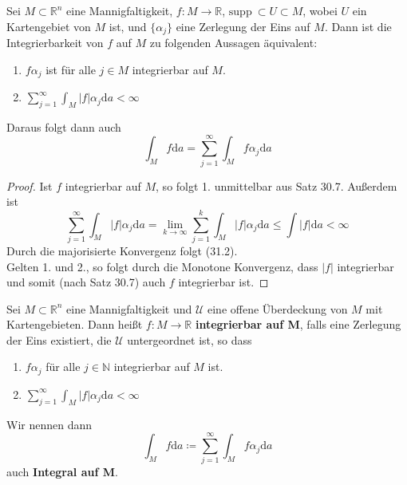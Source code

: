 \begin{lemma}
Sei $M\subset\mathbb{R}^n$ eine Mannigfaltigkeit, $f:M\rightarrow\mathbb{R}$, 
	$\mathrm{supp\ }\subset U \subset M$, wobei $U$ ein Kartengebiet 
	von $M$ ist, und $\{\alpha_j\}$ eine Zerlegung der Eins auf $M$. 
	Dann ist die Integrierbarkeit von $f$ auf $M$ zu folgenden 
	Aussagen äquivalent:
	\begin{enumerate}
		\item 	$f\alpha_j$ ist für alle $j\in M$ integrierbar auf $M$.
		\item	$\sum\limits_{j=1}^\infty\int_M|f|\alpha_j\mathrm{d}a<\infty$
	\end{enumerate}
	Daraus folgt dann auch
	\begin{equation}
		\int_Mf\mathrm{d}a=\sum\limits_{j=1}^\infty\int_Mf\alpha_j\mathrm{d}a
	\end{equation}
\end{lemma}

\begin{proof}
	Ist $f$ integrierbar auf $M$, so folgt 1. unmittelbar aus Satz 
	30.7. Außerdem ist
	\begin{equation*}
		\sum\limits_{j=1}^\infty\int_M|f|\alpha_j\mathrm{d}a = 
		\lim\limits_{ k \rightarrow \infty }\sum\limits_{j=1}^k\int_M|f|\alpha_j\mathrm{d}a \leq 
		\int|f|\mathrm{d}a < \infty
	\end{equation*}
	Durch die majorisierte Konvergenz folgt (31.2).\\
	Gelten 1. und 2., so folgt durch die Monotone Konvergenz, dass 
	$|f|$ integrierbar und somit (nach Satz 30.7) auch $f$ integrierbar 
	ist.
	
\end{proof}

\begin{definition}
	Sei $M\subset\mathbb{R}^n$ eine Mannigfaltigkeit und $\mathcal{U}$ 
	eine offene Überdeckung von $M$ mit Kartengebieten. Dann heißt 
	$f:M\rightarrow\mathbb{R}$ \textbf{integrierbar auf M}, falls eine
	Zerlegung der Eins existiert, die $\mathcal{U}$ untergeordnet ist, 
	so dass
	\begin{enumerate}
		\item 	$f\alpha_j$ für alle $j\in\mathbb{N}$ integrierbar
				 auf $M$ ist.
		\item 	$\sum\limits_{j=1}^\infty\int_M|f|\alpha_j\mathrm{d}a<\infty$
	\end{enumerate}	 
	Wir nennen dann 
	\begin{equation}
		\int_Mf\mathrm{d}a\coloneqq
		\sum\limits_{j=1}^\infty\int_Mf\alpha_j\mathrm{d}a
	\end{equation}
	auch \textbf{Integral auf M}.
\end{definition}

